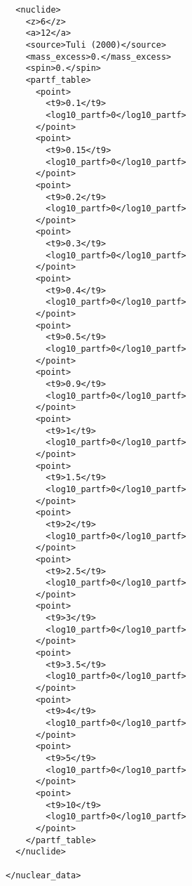 \documentclass{article}    %
\begin{document}
\begin{verbatim}
  <nuclide>
    <z>6</z>
    <a>12</a>
    <source>Tuli (2000)</source>
    <mass_excess>0.</mass_excess>
    <spin>0.</spin>
    <partf_table>
      <point>
        <t9>0.1</t9>
        <log10_partf>0</log10_partf>
      </point>
      <point>
        <t9>0.15</t9>
        <log10_partf>0</log10_partf>
      </point>
      <point>
        <t9>0.2</t9>
        <log10_partf>0</log10_partf>
      </point>
      <point>
        <t9>0.3</t9>
        <log10_partf>0</log10_partf>
      </point>
      <point>
        <t9>0.4</t9>
        <log10_partf>0</log10_partf>
      </point>
      <point>
        <t9>0.5</t9>
        <log10_partf>0</log10_partf>
      </point>
      <point>
        <t9>0.9</t9>
        <log10_partf>0</log10_partf>
      </point>
      <point>
        <t9>1</t9>
        <log10_partf>0</log10_partf>
      </point>
      <point>
        <t9>1.5</t9>
        <log10_partf>0</log10_partf>
      </point>
      <point>
        <t9>2</t9>
        <log10_partf>0</log10_partf>
      </point>
      <point>
        <t9>2.5</t9>
        <log10_partf>0</log10_partf>
      </point>
      <point>
        <t9>3</t9>
        <log10_partf>0</log10_partf>
      </point>
      <point>
        <t9>3.5</t9>
        <log10_partf>0</log10_partf>
      </point>
      <point>
        <t9>4</t9>
        <log10_partf>0</log10_partf>
      </point>
      <point>
        <t9>5</t9>
        <log10_partf>0</log10_partf>
      </point>
      <point>
        <t9>10</t9>
        <log10_partf>0</log10_partf>
      </point>
    </partf_table>
  </nuclide>

</nuclear_data>

\end{verbatim}
\end{document}
